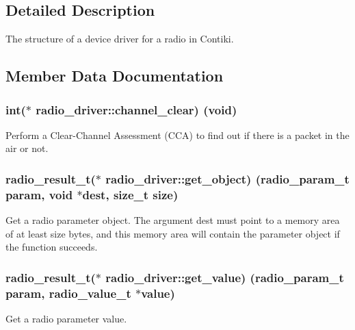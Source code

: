 \subsection{Detailed Description}
The structure of a device driver for a radio in Contiki. 

\subsection{Member Data Documentation}
\hypertarget{structradio__driver_a7c8c8b833955461003d18b41ffc24e4c}{}
\subsubsection[{channel\+\_\+clear}]{\setlength{\rightskip}{0pt plus 5cm}int($\ast$  radio\+\_\+driver\+::channel\+\_\+clear) (void)}\label{structradio__driver_a7c8c8b833955461003d18b41ffc24e4c}
Perform a Clear-\/\+Channel Assessment (C\+C\+A) to find out if there is a packet in the air or not. \hypertarget{structradio__driver_a74a0e490531928dd4195f0d962bd4681}{}
\subsubsection[{get\+\_\+object}]{\setlength{\rightskip}{0pt plus 5cm}radio\+\_\+result\+\_\+t($\ast$  radio\+\_\+driver\+::get\+\_\+object) (radio\+\_\+param\+\_\+t param, void $\ast$dest, size\+\_\+t size)}\label{structradio__driver_a74a0e490531928dd4195f0d962bd4681}
Get a radio parameter object. The argument \textquotesingle{}dest\textquotesingle{} must point to a memory area of at least \textquotesingle{}size\textquotesingle{} bytes, and this memory area will contain the parameter object if the function succeeds. \hypertarget{structradio__driver_a825eba300cda915050282bfec75787bd}{}
\subsubsection[{get\+\_\+value}]{\setlength{\rightskip}{0pt plus 5cm}radio\+\_\+result\+\_\+t($\ast$  radio\+\_\+driver\+::get\+\_\+value) (radio\+\_\+param\+\_\+t param, {\bf radio\+\_\+value\+\_\+t} $\ast$value)}\label{structradio__driver_a825eba300cda915050282bfec75787bd}
Get a radio parameter value. \hypertarget{structradio__driver_a109dee491698150e7431e70ebd727a41}{}
